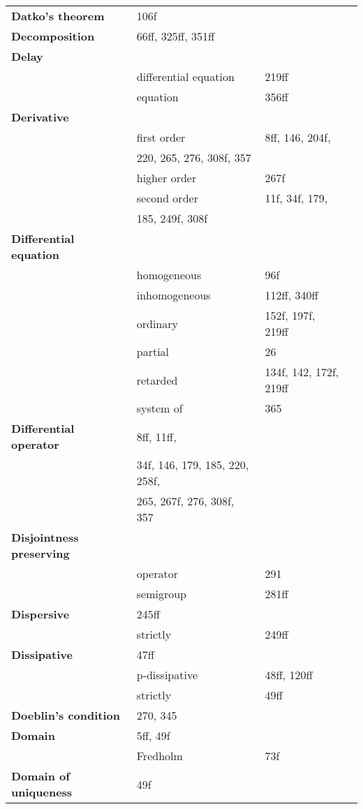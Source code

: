 \documentclass[10pt]{scrartcl}
\begin{document}
\begin{longtable}{>{\bfseries}p{5cm}p{4cm}p{4cm}p{4cm}}
Datko's theorem 	& 106f \\
Decomposition 	& 66ff, 325ff, 351ff \\
Delay 	& \\
	& differential equation 	& 219ff \\
	& equation 	& 356ff \\
Derivative 	& \\
	& first order 	& 8ff, 146, 204f, \\
	&   220, 265, 276, 308f, 357 \\
	& higher order 	& 267f \\
	& second order 	& 11f, 34f, 179, \\
	&   185, 249f, 308f \\
Differential equation 	& \\
	& homogeneous 	& 96f \\
	& inhomogeneous 	& 112ff, 340ff \\
	& ordinary 	& 152f, 197f, 219ff \\
	& partial 	& 26 \\
	& retarded 	& 134f, 142, 172f, 219ff \\
	& system of 	& 365 \\
Differential operator 	& 8ff, 11ff, \\
	&   34f, 146, 179, 185, 220, 258f, \\
	&   265, 267f, 276, 308f, 357 \\
Disjointness preserving 	& \\
	& operator 	& 291 \\
	& semigroup 	& 281ff \\
Dispersive 	& 245ff \\
	& strictly 	& 249ff \\
Dissipative 	& 47ff \\
	& p-dissipative 	& 48ff, 120ff \\
	& strictly 	& 49ff \\
Doeblin's condition 	& 270, 345 \\
Domain 	& 5ff, 49f \\
	& Fredholm 	& 73f \\
Domain of uniqueness 	& 49f \\

\end{longtable}
\end{document}
